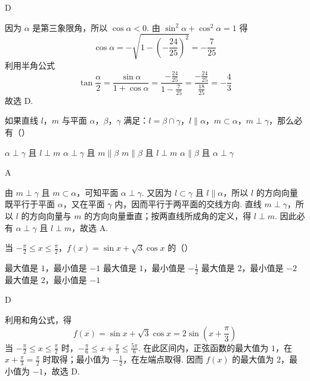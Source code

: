 \begin{answer}
D
\end{answer}

\begin{solution}
因为 \(\alpha\) 是第三象限角，所以 \(\cos\alpha<0\). 由 \(\sin^2\alpha+\cos^2\alpha=1\) 得
\[
\cos\alpha=-\sqrt{1-\left(-\frac{24}{25}\right)^2}=-\frac{7}{25}
\]
利用半角公式
\[
\tan\frac{\alpha}{2}=\frac{\sin\alpha}{1+\cos\alpha}
=\frac{-\frac{24}{25}}{1-\frac{7}{25}}
=\frac{-\frac{24}{25}}{\frac{18}{25}}=-\frac{4}{3}
\]
故选 D.
\end{solution}

\begin{problem}
如果直线 \(l\)，\(m\) 与平面 \(\alpha\)，\(\beta\)，\(\gamma\) 满足：\(l = \beta \cap \gamma\)，\(l \parallel \alpha\)，\(m \subset \alpha\)，\(m \perp \gamma\)，那么必有（\quad）

\choices
    {\(\alpha \perp \gamma\) 且 \(l \perp m\)}
    {\(\alpha \perp \gamma\) 且 \(m \parallel \beta\)}
    {\(m \parallel \beta\) 且 \(l \perp m\)}
    {\(\alpha \parallel \beta\) 且 \(\alpha \perp \gamma\)}
\end{problem}

\begin{answer}
A
\end{answer}

\begin{solution}
由 \(m\perp\gamma\) 且 \(m\subset\alpha\)，可知平面 \(\alpha\perp\gamma\). 又因为 \(l\subset\gamma\) 且 \(l\parallel\alpha\)，所以 \(l\) 的方向向量既平行于平面 \(\alpha\)，又在平面 \(\gamma\) 内，因而平行于两平面的交线方向. 直线 \(m\perp\gamma\)，所以 \(l\) 的方向向量与 \(m\) 的方向向量垂直；按两直线所成角的定义，得 \(l\perp m\). 因此必有 \(\alpha\perp\gamma\) 且 \(l\perp m\)，故选 A.
\end{solution}

\begin{problem}
当 \(-\frac{\pi}{2} \leqslant x \leqslant \frac{\pi}{2}\)，\(f(x) = \sin x + \sqrt{3} \cos x\) 的（\quad）

\choices
    {最大值是 \(1\)，最小值是 \(-1\)}
    {最大值是 \(1\)，最小值是 \(-\frac{1}{2} \)}
    {最大值是 \(2\)，最小值是 \(-2\)}
    {最大值是 \(2\)，最小值是 \(-1\)}
\end{problem}

\begin{answer}
D
\end{answer}

\begin{solution}
利用和角公式，得
\[
f(x)=\sin x+\sqrt{3}\cos x=2\sin\left(x+\frac{\pi}{3}\right)
\]
当 \(-\frac{\pi}{2}\leqslant x\leqslant\frac{\pi}{2}\) 时，\(-\frac{\pi}{6}\leqslant x+\frac{\pi}{3}\leqslant\frac{5\pi}{6}\). 在此区间内，正弦函数的最大值为 \(1\)，在 \(x+\frac{\pi}{3}=\frac{\pi}{2}\) 时取得；最小值为 \(-\frac{1}{2}\)，在左端点取得. 因而 \(f(x)\) 的最大值为 \(2\)，最小值为 \(-1\)，故选 D.
\end{solution}

